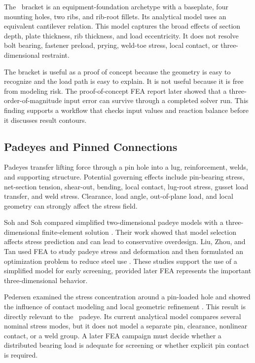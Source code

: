 The \NEMO\ bracket is an equipment-foundation archetype with a baseplate, four
mounting holes, two ribs, and rib-root fillets. Its analytical model uses an
equivalent cantilever relation. This model captures the broad effects of
section depth, plate thickness, rib thickness, and load eccentricity. It does
not resolve bolt bearing, fastener preload, prying, weld-toe stress, local
contact, or three-dimensional restraint.

The bracket is useful as a proof of concept because the geometry is easy to
recognize and the load path is easy to explain. It is not useful because it is
free from modeling risk. The proof-of-concept FEA report later showed that a
three-order-of-magnitude input error can survive through a completed solver
run. This finding supports a workflow that checks input values and reaction
balance before it discusses result contours.

\subsection{Padeyes and Pinned Connections}
\label{sec:padeye-review}

Padeyes transfer lifting force through a pin hole into a lug, reinforcement,
welds, and supporting structure. Potential governing effects include
pin-bearing stress, net-section tension, shear-out, bending, local contact,
lug-root stress, gusset load transfer, and weld stress. Clearance, load angle,
out-of-plane load, and local geometry can strongly affect the stress field.

Soh and Soh compared simplified two-dimensional padeye models with a
three-dimensional finite-element solution \cite{soh1989}. Their work showed
that model selection affects stress prediction and can lead to conservative
overdesign. Liu, Zhou, and Tan used FEA to study padeye stress and deformation
and then formulated an optimization problem to reduce steel use
\cite{liu2013}. These studies support the use of a simplified model for early
screening, provided later FEA represents the important three-dimensional
behavior.

Pedersen examined the stress concentration around a pin-loaded hole and
showed the influence of contact modeling and local geometric refinement
\cite{pedersen2019}. This result is directly relevant to the \NEMO\ padeye.
Its current analytical model compares several nominal stress modes, but it
does not model a separate pin, clearance, nonlinear contact, or a weld group.
A later FEA campaign must decide whether a distributed bearing load is
adequate for screening or whether explicit pin contact is required.

